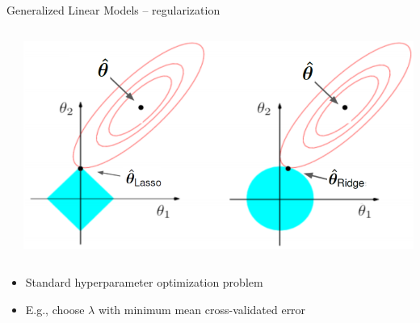 \begin{frame}{Generalized Linear Models -- regularization}
\begin{columns}[T, totalwidth=\textwidth]
\begin{column}{0.55\textwidth}
    \end{column}
        \begin{column}{0.45\textwidth}
          \includegraphics[width=\textwidth]{figure/l1_l2_hat.png}
    \end{column}
\end{columns}

\medskip
{}

\begin{itemize}
  \item Standard hyperparameter optimization problem
  \item E.g., choose $\lambda$ with minimum mean cross-validated error 
\end{itemize}
\end{frame}


